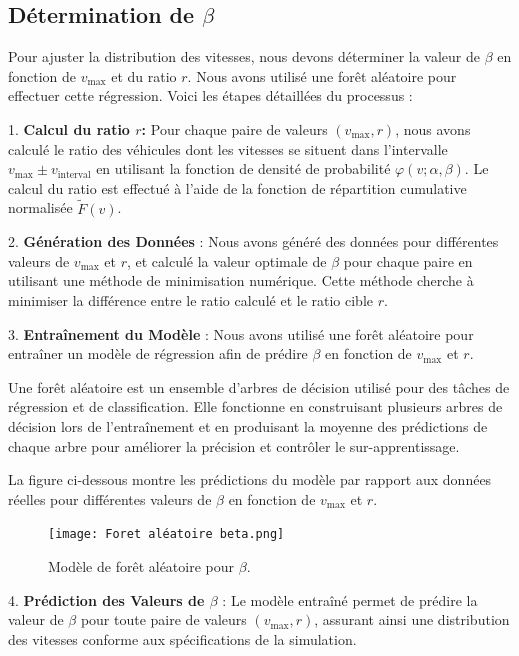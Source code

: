\documentclass{article}
\begin{document}
\subsection{Détermination de \(\beta\)}

Pour ajuster la distribution des vitesses, nous devons déterminer la valeur de \(\beta\) en fonction de \(v_{\text{max}}\) et du ratio \(r\). Nous avons utilisé une forêt aléatoire pour effectuer cette régression. Voici les étapes détaillées du processus :

1. \textbf{Calcul du ratio $r$:} 
   Pour chaque paire de valeurs \((v_{\text{max}}, r)\), nous avons calculé le ratio des véhicules dont les vitesses se situent dans l'intervalle \(v_{\text{max}} \pm v_{\text{interval}}\) en utilisant la fonction de densité de probabilité \(\varphi(v; \alpha, \beta)\). Le calcul du ratio est effectué à l'aide de la fonction de répartition cumulative normalisée \(\tilde{F}(v)\).

2. \textbf{Génération des Données} :
   Nous avons généré des données pour différentes valeurs de \(v_{\text{max}}\) et \(r\), et calculé la valeur optimale de \(\beta\) pour chaque paire en utilisant une méthode de minimisation numérique. Cette méthode cherche à minimiser la différence entre le ratio calculé et le ratio cible \(r\).

3. \textbf{Entraînement du Modèle} :
Nous avons utilisé une forêt aléatoire pour entraîner un modèle de régression afin de prédire \(\beta\) en fonction de \(v_{\text{max}}\) et \(r\). 

Une forêt aléatoire est un ensemble d'arbres de décision utilisé pour des tâches de régression et de classification. Elle fonctionne en construisant plusieurs arbres de décision lors de l'entraînement et en produisant la moyenne des prédictions de chaque arbre pour améliorer la précision et contrôler le sur-apprentissage.

La figure ci-dessous montre les prédictions du modèle par rapport aux données réelles pour différentes valeurs de \(\beta\) en fonction de \(v_{\text{max}}\) et \(r\).

\begin{figure}[h!]
 \centering
 \texttt{[image: Foret aléatoire beta.png]}
 \caption{Modèle de forêt aléatoire pour \(\beta\).}
 \label{fig:foret_aleatoire_beta}
\end{figure}

4. \textbf{Prédiction des Valeurs de \(\beta\)} :
   Le modèle entraîné permet de prédire la valeur de \(\beta\) pour toute paire de valeurs \((v_{\text{max}}, r)\), assurant ainsi une distribution des vitesses conforme aux spécifications de la simulation.
\end{document}

